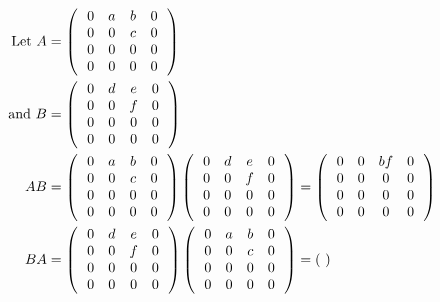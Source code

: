 \documentclass[12pt,a4paper]{report}
\newcommand{\BLUE}[1]{\textcolor{blue}{#1}}
\begin{document}
\begin{enumerate}[label=3.\arabic*.]
\begin{enumerate}[label=(\roman*)]
	\BLUE{\begin{align*}
	\text{Let } A &= \left (\, \begin{array}{cccc}
		0&a&b&0 \\
		0&0&c&0\\
		0&0&0&0\\
		0&0&0&0\\	
	\end{array}
	 \,\right )\\
	\text{ and } B &= \left (\, \begin{array}{cccc}
		0&d&e&0 \\
		0&0&f&0\\
		0&0&0&0\\
		0&0&0&0\\	
	\end{array}
	 \,\right )\\
	AB &=	\left (\, \begin{array}{cccc}
		0&a&b&0 \\
		0&0&c&0\\
		0&0&0&0\\
		0&0&0&0\\	
	\end{array}
	 \,\right )\left (\, \begin{array}{cccc}
		0&d&e&0 \\
		0&0&f&0\\
		0&0&0&0\\
		0&0&0&0\\	
	\end{array}
	 \,\right ) = \left (\, \begin{array}{cccc}
		0&0&bf&0 \\
		0&0&0&0\\
		0&0&0&0\\
		0&0&0&0\\	
	\end{array}
	 \,\right ) \\
	BA &= \left (\, \begin{array}{cccc}
		0&d&e&0 \\
		0&0&f&0\\
		0&0&0&0\\
		0&0&0&0\\	
	\end{array}
	 \,\right )\left (\, \begin{array}{cccc}
		0&a&b&0 \\
		0&0&c&0\\
		0&0&0&0\\
		0&0&0&0\\	
	\end{array}
	 \,\right ) = \left (\, \begin{array}{cccc}

\end{array} \,\right )
\end{align*}}
\end{enumerate}
\end{enumerate}
\end{document}
